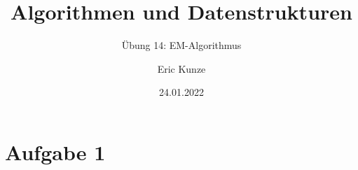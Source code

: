 \documentclass{beamer}
\DeclareMathOperator*{\argmax}{arg\,max}
\DeclareMathOperator{\mle}{mle}
\DeclareMathOperator{\rfe}{rfe}
\begin{document}
	
	\title{Algorithmen und Datenstrukturen}
	\subtitle{Übung 14: EM-Algorithmus}
	\author{Eric Kunze}
	\date{24.01.2022}

	\maketitle


\section{Aufgabe 1}

%	
%	
%	
\end{document}
